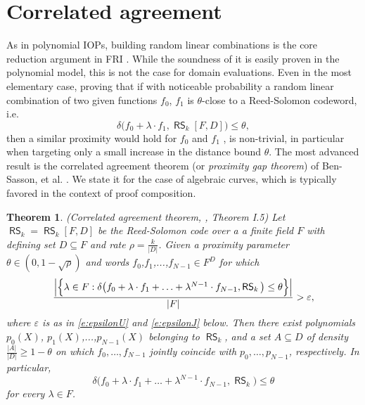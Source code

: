 \documentclass[11pt]{article}
\newtheorem{thm}{Theorem}[]
\theoremstyle{definition}
\theoremstyle{remark}
\DeclareMathOperator{\RS}{\mathsf{RS}}
\begin{document}
\section{Correlated agreement}

As in polynomial IOPs, building random linear combinations is the core reduction argument in FRI . 
While the soundness of it is easily proven in the polynomial model, this is not the case for domain evaluations. 
Even in the most elementary case, proving that if with noticeable probability a random linear combination  of two  given functions $f_0$, $f_1$ is $\theta$-close to a Reed-Solomon codeword, i.e.
\[
\delta\big(f_0 + \lambda\cdot f_1, \RS_k[F,D]\big) \leq \theta,
\]
 then a similar proximity  would hold for $f_0$ and $f_1$ , is non-trivial, in particular when targeting only a small increase in the distance bound $\theta$.  
The most advanced result is the correlated agreement theorem (or \textit{proximity gap theorem}) of Ben-Sasson, et al. \cite{ProximityGaps}.
We state it for the case of algebraic curves, which is typically favored in the context of proof composition.

\begin{thm}
\label{thm:CorrelatedAgreement}
(Correlated agreement theorem, \cite{ProximityGaps}, Theorem I.5)
Let $\RS_k = \RS_k[F,D]$ be the Reed-Solomon code over a a finite field $F$ with defining set $D\subseteq F$ and rate $\rho=\frac{k}{|D|}$.
Given a proximity parameter $\theta\in (0,1-\sqrt\rho)$  and words $f_0$,$f_1$,...,$f_{N-1}\in F^D$ for which
\begin{equation*}
\frac{%
	\Big|\Big\{\lambda\in F : \delta\big(f_0 + \lambda\cdot f_1 + \ldots + \lambda^{N-1}\cdot f_{N-1}, \RS_k\big) \leq \theta \Big\} \Big|
}{|F|} > \varepsilon,
\end{equation*}
where $\varepsilon$ is as in \eqref{e:epsilonU} and \eqref{e:epsilonJ}  below.
Then there exist polynomials $p_0(X)$, $p_1(X)$,...,$p_{N-1}(X)$ belonging to $\RS_k$, and a set $A\subseteq D$ of density 
$
\frac{|A|}{|D|}\geq 1 - \theta
$ 
on which $f_0, \ldots, f_{N-1}$ jointly coincide with $p_0, \ldots, p_{N-1}$, respectively. 
In particular, 
\begin{equation*}
\delta\big(f_0 + \lambda\cdot f_1 + \ldots + \lambda^{N-1}\cdot f_{N-1}, \RS_k\big) \leq \theta
\end{equation*}
for every $\lambda\in F$. 
\end{thm}
\end{document}
